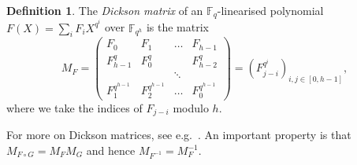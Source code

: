 \documentclass[a4paper]{article}
\newtheorem{thm}{Theorem}[section]
\theoremstyle{definition}
\newtheorem{df}[thm]{Definition}
\newcommand{\FF}{\mathbb F}
\begin{document}
\begin{df}
The \emph{Dickson matrix} of an $\FF_q$-linearised polynomial $F(X) = \sum_i F_i X^{q^i}$ over $\FF_{q^h}$ is the matrix
\[
 M_F = \begin{pmatrix}
 F_0 & F_1 & \dots & F_{h-1} \\
 F_{h-1}^q & F_0^q &  & F_{h-2}^q \\
  & & \ddots \\
 F_1^{q^{h-1}} & F_2^{q^{h-1}} & \dots & F_0^{q^{h-1}}
 \end{pmatrix}
 = \left(F_{j-i}^{q^i} \right)_{i,j \in [0,h-1]},
\]
where we take the indices of $F_{j-i}$ modulo $h$.
\end{df}

For more on Dickson matrices, see e.g.\ \cite{wuliu}.
An important property is that $M_{F \circ G} = M_F M_G$ and hence $M_{F^{-1}} = M_F^{-1}$.

\end{document}
